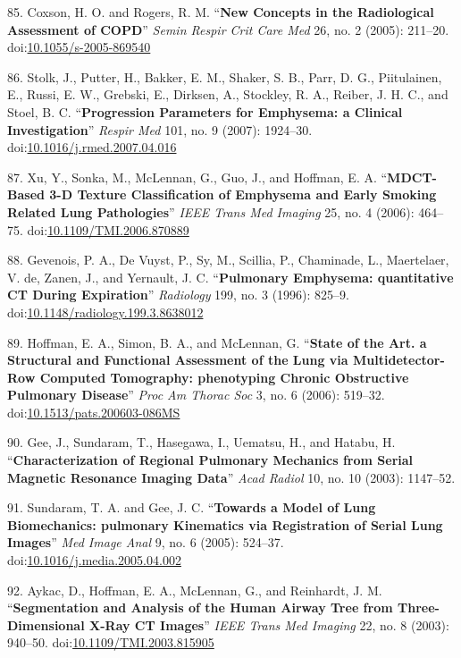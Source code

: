 \documentclass[11pt,]{article}
\begin{document}
85. Coxson, H. O. and Rogers, R. M. ``\textbf{New Concepts in the
Radiological Assessment of COPD}'' \emph{Semin Respir Crit Care Med} 26,
no. 2 (2005): 211--20.
doi:\href{http://dx.doi.org/10.1055/s-2005-869540}{10.1055/s-2005-869540}

86. Stolk, J., Putter, H., Bakker, E. M., Shaker, S. B., Parr, D. G.,
Piitulainen, E., Russi, E. W., Grebski, E., Dirksen, A., Stockley, R.
A., Reiber, J. H. C., and Stoel, B. C. ``\textbf{Progression Parameters
for Emphysema: a Clinical Investigation}'' \emph{Respir Med} 101, no. 9
(2007): 1924--30.
doi:\href{http://dx.doi.org/10.1016/j.rmed.2007.04.016}{10.1016/j.rmed.2007.04.016}

87. Xu, Y., Sonka, M., McLennan, G., Guo, J., and Hoffman, E. A.
``\textbf{MDCT-Based 3-D Texture Classification of Emphysema and Early
Smoking Related Lung Pathologies}'' \emph{IEEE Trans Med Imaging} 25,
no. 4 (2006): 464--75.
doi:\href{http://dx.doi.org/10.1109/TMI.2006.870889}{10.1109/TMI.2006.870889}

88. Gevenois, P. A., De Vuyst, P., Sy, M., Scillia, P., Chaminade, L.,
Maertelaer, V. de, Zanen, J., and Yernault, J. C. ``\textbf{Pulmonary
Emphysema: quantitative CT During Expiration}'' \emph{Radiology} 199,
no. 3 (1996): 825--9.
doi:\href{http://dx.doi.org/10.1148/radiology.199.3.8638012}{10.1148/radiology.199.3.8638012}

89. Hoffman, E. A., Simon, B. A., and McLennan, G. ``\textbf{State of
the Art. a Structural and Functional Assessment of the Lung via
Multidetector-Row Computed Tomography: phenotyping Chronic Obstructive
Pulmonary Disease}'' \emph{Proc Am Thorac Soc} 3, no. 6 (2006): 519--32.
doi:\href{http://dx.doi.org/10.1513/pats.200603-086MS}{10.1513/pats.200603-086MS}

90. Gee, J., Sundaram, T., Hasegawa, I., Uematsu, H., and Hatabu, H.
``\textbf{Characterization of Regional Pulmonary Mechanics from Serial
Magnetic Resonance Imaging Data}'' \emph{Acad Radiol} 10, no. 10 (2003):
1147--52.

91. Sundaram, T. A. and Gee, J. C. ``\textbf{Towards a Model of Lung
Biomechanics: pulmonary Kinematics via Registration of Serial Lung
Images}'' \emph{Med Image Anal} 9, no. 6 (2005): 524--37.
doi:\href{http://dx.doi.org/10.1016/j.media.2005.04.002}{10.1016/j.media.2005.04.002}

92. Aykac, D., Hoffman, E. A., McLennan, G., and Reinhardt, J. M.
``\textbf{Segmentation and Analysis of the Human Airway Tree from
Three-Dimensional X-Ray CT Images}'' \emph{IEEE Trans Med Imaging} 22,
no. 8 (2003): 940--50.
doi:\href{http://dx.doi.org/10.1109/TMI.2003.815905}{10.1109/TMI.2003.815905}
\end{document}
